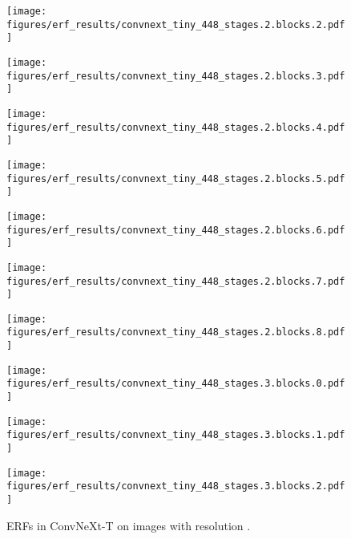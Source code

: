 \documentclass{article}
\begin{document}
\begin{figure}[tb]
\begin{minipage}[t]{0.13\hsize}
    \centering
    \texttt{[image: figures/erf\_results/convnext\_tiny\_448\_stages.2.blocks.2.pdf]}
    \label{figure:erf_convnext_448:8}
  \end{minipage}
  \begin{minipage}[t]{0.13\hsize}
    \centering
    \texttt{[image: figures/erf\_results/convnext\_tiny\_448\_stages.2.blocks.3.pdf]}
    \label{figure:erf_convnext_448:9}
  \end{minipage}
  \begin{minipage}[t]{0.13\hsize}
    \centering
    \texttt{[image: figures/erf\_results/convnext\_tiny\_448\_stages.2.blocks.4.pdf]}
    \label{figure:erf_convnext_448:10}
  \end{minipage}
  \begin{minipage}[t]{0.13\hsize}
    \centering
    \texttt{[image: figures/erf\_results/convnext\_tiny\_448\_stages.2.blocks.5.pdf]}
    \label{figure:erf_convnext_448:11}
  \end{minipage}
  \begin{minipage}[t]{0.13\hsize}
    \centering
    \texttt{[image: figures/erf\_results/convnext\_tiny\_448\_stages.2.blocks.6.pdf]}
    \label{figure:erf_convnext_448:12}
  \end{minipage}
  \begin{minipage}[t]{0.13\hsize}
    \centering
    \texttt{[image: figures/erf\_results/convnext\_tiny\_448\_stages.2.blocks.7.pdf]}
    \label{figure:erf_convnext_448:13}
  \end{minipage}
  \begin{minipage}[t]{0.13\hsize}
    \centering
    \texttt{[image: figures/erf\_results/convnext\_tiny\_448\_stages.2.blocks.8.pdf]}
    \label{figure:erf_convnext_448:14}
  \end{minipage}
  \begin{minipage}[t]{0.13\hsize}
    \centering
    \texttt{[image: figures/erf\_results/convnext\_tiny\_448\_stages.3.blocks.0.pdf]}
    \label{figure:erf_convnext_448:15}
  \end{minipage}
  \begin{minipage}[t]{0.13\hsize}
    \centering
    \texttt{[image: figures/erf\_results/convnext\_tiny\_448\_stages.3.blocks.1.pdf]}
    \label{figure:erf_convnext_448:16}
  \end{minipage}
  \begin{minipage}[t]{0.13\hsize}
    \centering
    \texttt{[image: figures/erf\_results/convnext\_tiny\_448\_stages.3.blocks.2.pdf]}
    \label{figure:erf_convnext_448:17}
  \end{minipage}
  \caption{ERFs in ConvNeXt-T \cite{liu2022convnet} on images with resolution .}
    \label{figure:erf_convnext_448}
\end{figure} 
\end{document}
